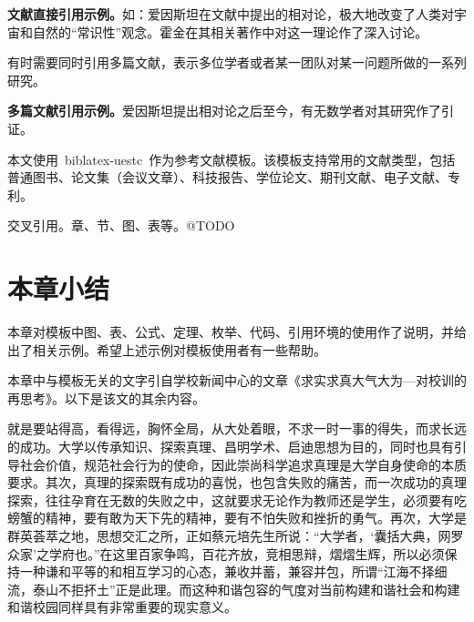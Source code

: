 	{\bfseries 文献直接引用示例。}如：爱因斯坦在文献\parencite{einstein1935}中提出的相对论，极大地改变了人类对宇宙和自然的“常识性”观念。霍金在其相关著作\cite{hawking1973}中对这一理论作了深入讨论。
	
	有时需要同时引用多篇文献，表示多位学者或者某一团队对某一问题所做的一系列研究。
	
	{\bfseries 多篇文献引用示例。}爱因斯坦提出相对论之后至今，有无数学者对其研究作了引证\cite{breitenlohner1984, brandt1997, misner1957, regge1957}。
	
	本文使用~biblatex-uestc~作为参考文献模板。该模板支持常用的文献类型，包括普通图书\cite{hawking1973}、论文集（会议文章）\cite{abramson1970}、科技报告\cite{wwwdevreport}、学位论文\cite{lichg2004}、期刊文献\cite{einstein1935}、电子文献\cite{scigen}、专利\cite{guoxb2012}。

	交叉引用。章、节、图、表等。@TODO

\section{本章小结}
	本章对模板中图、表、公式、定理、枚举、代码、引用环境的使用作了说明，并给出了相关示例。希望上述示例对模板使用者有一些帮助。
	
	本章中与模板无关的文字引自学校新闻中心的文章《求实求真大气大为—对校训的再思考》\cite{xiaoxun}。以下是该文的其余内容。
	
	 就是要站得高，看得远，胸怀全局，从大处着眼，不求一时一事的得失，而求长远的成功。大学以传承知识、探索真理、昌明学术、启迪思想为目的，同时也具有引导社会价值，规范社会行为的使命，因此崇尚科学追求真理是大学自身使命的本质要求。其次，真理的探索既有成功的喜悦，也包含失败的痛苦，而一次成功的真理探索，往往孕育在无数的失败之中，这就要求无论作为教师还是学生，必须要有吃螃蟹的精神，要有敢为天下先的精神，要有不怕失败和挫折的勇气。再次，大学是群英荟萃之地，思想交汇之所，正如蔡元培先生所说：“大学者，‘囊括大典，网罗众家’之学府也。”在这里百家争鸣，百花齐放，竞相思辩，熠熠生辉，所以必须保持一种谦和平等的和相互学习的心态，兼收并蓄，兼容并包，所谓“江海不择细流，泰山不拒抔土”正是此理。而这种和谐包容的气度对当前构建和谐社会和构建和谐校园同样具有非常重要的现实意义。

